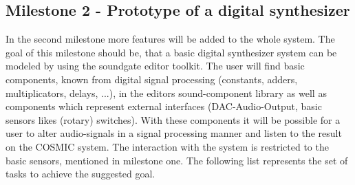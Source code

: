 \subsection{Milestone 2 - Prototype of a digital synthesizer}

In the second milestone more features will be added to the whole system. 
The goal of this milestone should be, that a basic digital synthesizer system can be modeled by using the soundgate editor toolkit. 
The user will find basic components, known from digital signal processing (constants, adders, multiplicators, delays, ...), in the editors sound-component library as well as components which represent external interfaces (DAC-Audio-Output, basic sensors likes (rotary) switches).
 With these components it will be possible for a user to alter audio-signals in a signal processing manner and listen to the result on the \ac{COSMIC} system. 
 The interaction with the system is restricted to the basic sensors, mentioned in milestone one. The following list represents the set of tasks to achieve the suggested goal.

